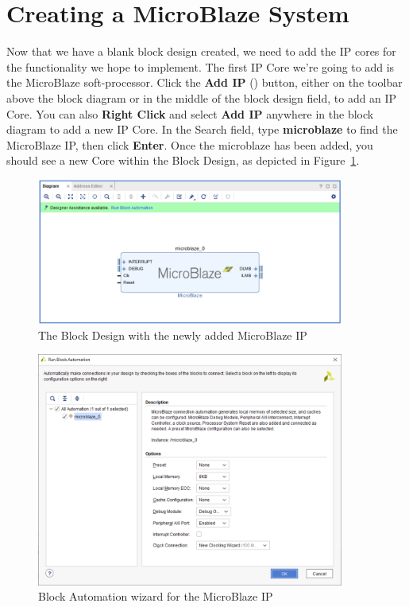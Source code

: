 \documentclass[11pt]{article}
\begin{document}
\section{Creating a MicroBlaze System}
\label{sec:adding_cores}
Now that we have a blank block design created, we need to add the IP cores for the functionality we hope to implement. The first IP Core we're going to add is the MicroBlaze soft-processor. Click the \textbf{Add IP}
()
button, either on the toolbar above the block diagram or in the middle of the block design field, to add an IP Core. You can also \textbf{Right Click} and select \textbf{Add IP} anywhere in the block diagram to add a new IP Core. In the Search field, type \textbf{microblaze} to find the MicroBlaze IP, then click \textbf{Enter}. Once the microblaze has been added, you should see a new Core within the Block Design, as depicted in Figure~\ref{fig:just_mb}.

\begin{figure}[h]
    \centering
    \includegraphics[width=0.9\textwidth]{images/just_mb.png}
    \caption{The Block Design with the newly added MicroBlaze IP}
    \label{fig:just_mb}
\end{figure}

\begin{figure}[!h]
    \centering
    \includegraphics[width=0.9\textwidth]{images/block_auto.png}
    \caption{Block Automation wizard for the MicroBlaze IP}
    \label{fig:block_auto}
\end{figure}
\end{document}
